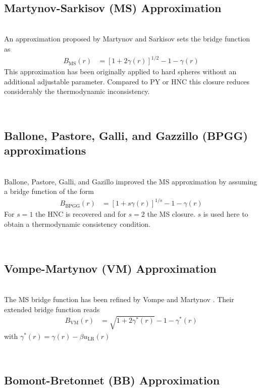 \vphantom{.}~\\
\subsection{Martynov-Sarkisov (MS) Approximation}
\label{sec:MS}~\\

An approximation proposed by Martynov and Sarkisov \cite{Martynov1983} sets the bridge function as
\begin{align}
B_\text{MS}(r) &= \left[1+2\gamma(r)\right]^{1/2}-1-\gamma(r)
\end{align}
This approximation has been originally applied to hard spheres without an additional adjustable parameter.
Compared to PY or HNC this closure reduces considerably the thermodynamic inconsistency.

\vphantom{.}~\\
\subsection{Ballone, Pastore, Galli, and Gazzillo (BPGG) approximations }
~\\

Ballone, Pastore, Galli, and Gazillo  \cite{Ballone1986}
improved the MS approximation by assuming a bridge function of the form
\begin{align}
B_\text{BPGG}(r) &= \left[1+s\gamma(r)\right]^{1/s}-1-\gamma(r)
\end{align}
For $s=1$ the HNC is recovered and for $s=2$ the MS closure. $s$ is used here to
obtain a thermodynamic consistency condition.

\vphantom{.}~\\
\subsection{Vompe-Martynov (VM) Approximation}
~\\

The MS bridge function \cite{Martynov1983} has been refined by Vompe and Martynov \cite{Vompe1994}.
Their extended bridge function reads
\begin{align}
B_\text{VM}(r) &= \sqrt{1+2\gamma^*(r)}-1-\gamma^*(r)
\end{align}
with $\gamma^*(r) = \gamma(r) - \beta u_\text{LR}(r)$

\vphantom{.}~\\
\subsection{Bomont-Bretonnet (BB) Approximation}
~\\

